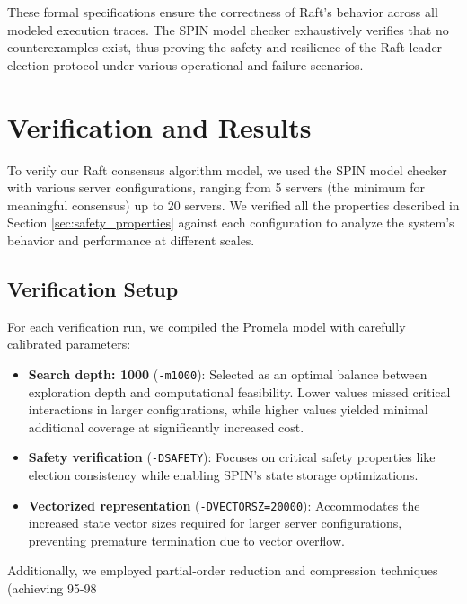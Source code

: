 \documentclass[a4paper]{llncs}
\begin{document}
These formal specifications ensure the correctness of Raft's behavior across all modeled execution traces. The SPIN model checker exhaustively verifies that no counterexamples exist, thus proving the safety and resilience of the Raft leader election protocol under various operational and failure scenarios.

\section{Verification and Results}
\label{sec:verification_results}

To verify our Raft consensus algorithm model, we used the SPIN model checker with various server configurations, ranging from 5 servers (the minimum for meaningful consensus) up to 20 servers. We verified all the properties described in Section \ref{sec:safety_properties} against each configuration to analyze the system's behavior and performance at different scales.

\subsection{Verification Setup}
\label{sec:verification_setup}

For each verification run, we compiled the Promela model with carefully calibrated parameters:
\begin{itemize}
    \item \textbf{Search depth: 1000} (\texttt{-m1000}): Selected as an optimal balance between exploration depth and computational feasibility. Lower values missed critical interactions in larger configurations, while higher values yielded minimal additional coverage at significantly increased cost.
    
    \item \textbf{Safety verification} (\texttt{-DSAFETY}): Focuses on critical safety properties like election consistency while enabling SPIN's state storage optimizations.
    
    \item \textbf{Vectorized representation} (\texttt{-DVECTORSZ=20000}): Accommodates the increased state vector sizes required for larger server configurations, preventing premature termination due to vector overflow.
\end{itemize}

Additionally, we employed partial-order reduction and compression techniques (achieving 95-98%
\end{document}
